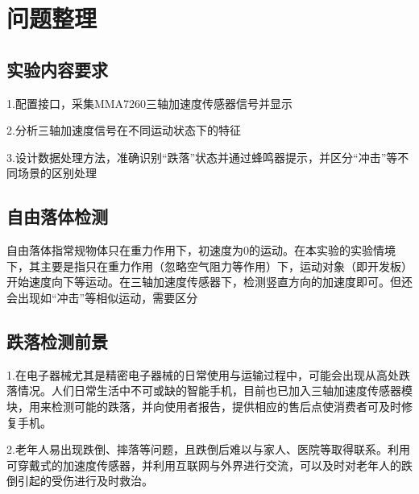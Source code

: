 \section{问题整理}

\subsection{实验内容要求}
\par{1.配置接口，采集MMA7260三轴加速度传感器信号并显示}
\par{2.分析三轴加速度信号在不同运动状态下的特征}
\par{3.设计数据处理方法，准确识别“跌落”状态并通过蜂鸣器提示，并区分“冲击”等不同场景的区别处理
}

\subsection{自由落体检测}
\par{自由落体指常规物体只在重力作用下，初速度为0的运动。在本实验的实验情境下，其主要是指只在重力作用（忽略空气阻力等作用）下，运动对象（即开发板）开始速度向下等运动。在三轴加速度传感器下，检测竖直方向的加速度即可。但还会出现如“冲击”等相似运动，需要区分}

\subsection{跌落检测前景}
\par{1.在电子器械尤其是精密电子器械的日常使用与运输过程中，可能会出现从高处跌落情况。人们日常生活中不可或缺的智能手机，目前也已加入三轴加速度传感器模块，用来检测可能的跌落，并向使用者报告，提供相应的售后点使消费者可及时修复手机。}
\par{2.老年人易出现跌倒、摔落等问题，且跌倒后难以与家人、医院等取得联系。利用可穿戴式的加速度传感器，并利用互联网与外界进行交流，可以及时对老年人的跌倒引起的受伤进行及时救治。}
